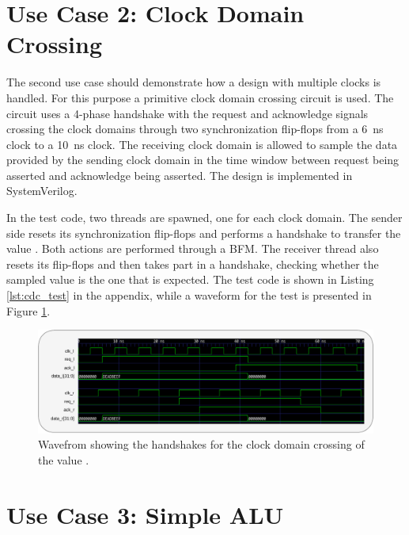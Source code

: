 \section{Use Case 2: Clock Domain Crossing} %

The second use case should demonstrate how a design with multiple clocks is handled. For this purpose a primitive
clock domain crossing circuit is used. The circuit uses a 4-phase handshake with the request and acknowledge signals
crossing the clock domains through two synchronization flip-flops from a \SI{6}{ns} clock to a \SI{10}{ns} clock. The
receiving clock domain is allowed to sample the data provided by the sending clock domain in the time window between
request being asserted and acknowledge being asserted. The design is implemented in SystemVerilog.

In the test code, two threads are spawned, one for each clock domain. The sender side resets its synchronization
flip-flops and performs a handshake to transfer the value . Both actions are performed through a BFM.
The receiver thread also resets its flip-flops and then takes part in a handshake, checking whether the sampled value
is the one that is expected. The test code is shown in Listing \ref{lst:cdc_test} in the appendix, while a waveform
for the test is presented in Figure \ref{fig:cdc_timing}.

\begin{figure}[t]
  \centering
  \includegraphics[width=\textwidth]{diagrams/cdc_timing.pdf}
  \caption{Wavefrom showing the handshakes for the clock domain crossing of the value .}
  \label{fig:cdc_timing}
\end{figure}

\section{Use Case 3: Simple ALU} %

